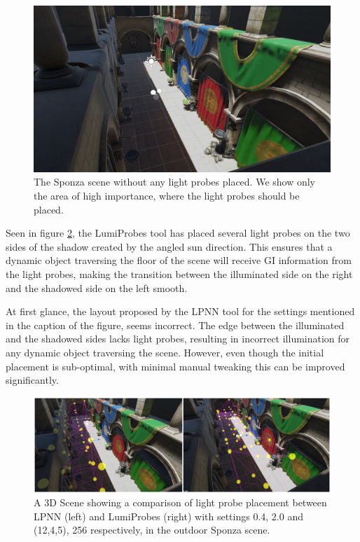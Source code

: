 \begin{figure}[h]
	\centering
	\includegraphics[width=\linewidth]{Graphics/results/sponza.jpg}
	\caption{The Sponza scene \parencite{Sponza2017} without any light probes placed. We show only the area of high importance, where the light probes should be placed.}
	\label{fig:sponza}
\end{figure}

Seen in figure \ref{fig:comp5}, the LumiProbes tool has placed several light probes on the two sides of the shadow created by the angled sun direction. This ensures that a dynamic object traversing the floor of the scene will receive GI information from the light probes, making the transition between the illuminated side on the right and the shadowed side on the left smooth. 

At first glance, the layout proposed by the LPNN tool for the settings mentioned in the caption of the figure, seems incorrect. The edge between the illuminated and the shadowed sides lacks light probes, resulting in incorrect illumination for any dynamic object traversing the scene. However, even though the initial placement is sub-optimal, with minimal manual tweaking this can be improved significantly.

\begin{figure}[h]
	\centering
	\includegraphics[width=\linewidth]{Graphics/results/concats/comparison4.png}
	\caption{A 3D Scene showing a comparison of light probe placement between LPNN (left) and LumiProbes (right) with settings 0.4, 2.0 and (12,4,5), 256 respectively, in the outdoor Sponza scene.}
	\label{fig:comp5}
\end{figure}

